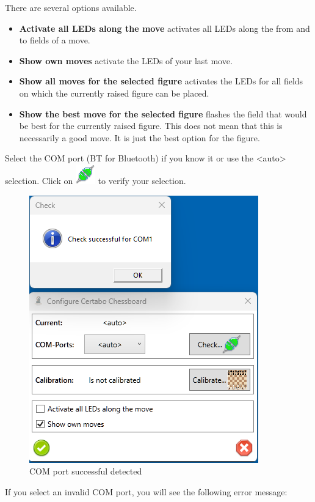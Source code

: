 \documentclass[11pt,a4paper]{article}
\begin{document}
There are several options available.
\begin{itemize}
	\item \textbf{Activate all LEDs along the move} activates all LEDs along the from and to fields of a move.
	\item \textbf{Show own moves} activate the LEDs of your last move.
	\item \textbf{Show all moves for the selected figure} activates the LEDs for all fields on which the currently raised figure can be placed.
	\item \textbf{Show the best move for the selected figure} flashes the field that would be best for the currently raised figure. This does not mean that this is necessarily a good move. It is just the best option for the figure.
\end{itemize}


Select the COM port (BT for Bluetooth) if you know it or use the <auto> selection. 
Click on \includegraphics[scale=0.5]{connect.png} to verify your selection.

\begin{figure}[H]
	\centering
	\includegraphics[scale=0.9]{Calibrate1.png}
	\caption{COM port successful detected}
	\label{fig:Calibrate1}
\end{figure}

If you select an invalid COM port, you will see the following error message:
\end{document}

